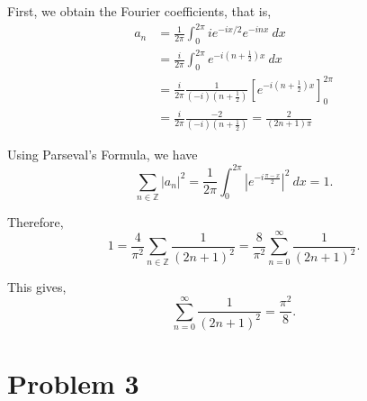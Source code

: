 \documentclass[12pt]{amsart}
\newcommand{\Z}{\mathbb{Z}}
\begin{document}
First, we obtain the Fourier coefficients, that is, 
\begin{align*}
    a_n &= \frac{1}{2\pi}\int_{0}^{2\pi} ie^{-ix/2}e^{-inx}~dx\\
    &= \frac{i}{2\pi}\int_{0}^{2\pi} e^{-i\left(n + \frac{1}{2}\right)x}~dx\\
    &= \frac{i}{2\pi}\frac{1}{(-i)\left(n + \frac{1}{2}\right)}\left[e^{-i\left(n + \frac{1}{2}\right)x}\right]_0^{2\pi}\\
    &= \frac{i}{2\pi}\frac{-2}{(-i)\left(n + \frac{1}{2}\right)} = \frac{2}{(2n + 1)\pi}
\end{align*}

Using Parseval's Formula, we have 
\begin{equation*}
    \sum_{n\in\Z}|a_n|^2 = \frac{1}{2\pi}\int_{0}^{2\pi}\left|e^{-i\frac{\pi - x}{2}}\right|^2~dx = 1.
\end{equation*}

Therefore, 
\begin{equation*}
    1 = \frac{4}{\pi^2}\sum_{n\in\Z}\frac{1}{(2n + 1)^2} = \frac{8}{\pi^2}\sum_{n = 0}^\infty\frac{1}{(2n + 1)^2}.
\end{equation*}

This gives,
\begin{equation*}
    \sum_{n = 0}^\infty\frac{1}{(2n + 1)^2} = \frac{\pi^2}{8}.
\end{equation*}

\section*{Problem 3}
\end{document}
